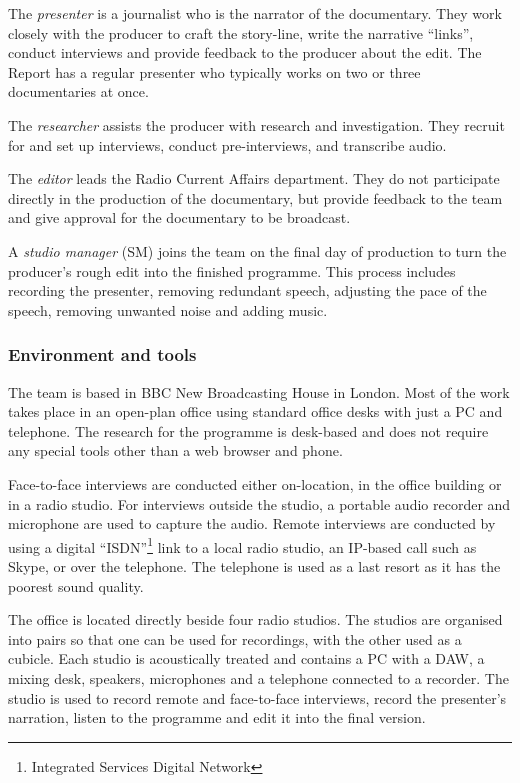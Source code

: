The \textit{presenter} is a journalist who is the narrator of the documentary. They work closely with the producer to
craft the story-line, write the narrative ``links'', conduct interviews and provide feedback to the producer about the
edit. The Report has a regular presenter who typically works on two or three documentaries at once.

The \textit{researcher} assists the producer with research and investigation. They recruit for and set up interviews,
conduct pre-interviews, and transcribe audio. 

The \textit{editor} leads the Radio Current Affairs department. They do not participate directly in the production of
the documentary, but provide feedback to the team and give approval for the documentary to be broadcast.

A \textit{studio manager} (SM) joins the team on the final day of production to turn the producer's rough edit into
the finished programme. This process includes recording the presenter, removing redundant speech, adjusting the pace of
the speech, removing unwanted noise and adding music.

\subsubsection{Environment and tools}
The team is based in BBC New Broadcasting House in London. Most of the work takes place in an open-plan office using
standard office desks with just a PC and telephone. The research for the programme is desk-based and does not require
any special tools other than a web browser and phone.

Face-to-face interviews are conducted either on-location, in the office building or in a radio studio.  For interviews
outside the studio, a portable audio recorder and microphone are used to capture the audio.  Remote interviews are
conducted by using a digital ``ISDN''\footnote{Integrated Services Digital Network} link to a local radio studio, an
IP-based call such as Skype, or over the telephone. The telephone is used as a last resort as it has the poorest sound
quality.

The office is located directly beside four radio studios. The studios are organised into pairs so that one can be used
for recordings, with the other used as a cubicle. Each studio is acoustically treated and contains a PC with a DAW,
a mixing desk, speakers, microphones and a telephone connected to a recorder. The studio is used to record remote and
face-to-face interviews, record the presenter's narration, listen to the programme and edit it into the final
version.

